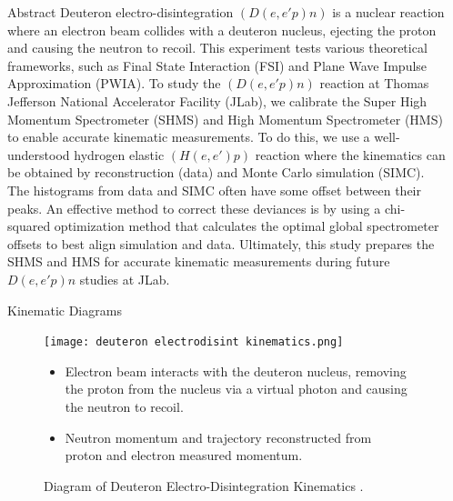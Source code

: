\documentclass[final]{beamer}
\newlength{\sepwidth}
\newlength{\colwidth}
\newcommand{\separatorcolumn}{\begin{column}{\sepwidth}\end{column}}
\begin{document}
\begin{frame}[t]
\begin{columns}[t]
\separatorcolumn

\begin{column}{\colwidth}
\vspace{-.5cm}
  \begin{exampleblock}{Abstract}
    Deuteron electro-disintegration $(D(e,e'p)n)$ is a nuclear reaction where an electron beam collides with a deuteron nucleus, ejecting the proton and causing the neutron to recoil. This experiment tests various theoretical frameworks, such as Final State Interaction (FSI) and Plane Wave Impulse Approximation (PWIA). To study the $(D(e, e'p)n)$ reaction at Thomas Jefferson National Accelerator Facility (JLab), we calibrate the Super High Momentum Spectrometer (SHMS) and High Momentum Spectrometer (HMS) to enable accurate kinematic measurements. To do this, we use a well-understood hydrogen elastic $(H(e, e')p)$ reaction where the kinematics can be obtained by reconstruction (data) and Monte Carlo simulation (SIMC). The histograms from data and SIMC often have some offset between their peaks. An effective method to correct these deviances is by using a chi-squared optimization method that calculates the optimal global spectrometer offsets to best align simulation and data. Ultimately, this study prepares the SHMS and HMS for accurate kinematic measurements during future $D(e,e'p)n$ studies at JLab.
    \end{exampleblock}
\vspace{-0.5cm}
  \begin{block}{Kinematic Diagrams}
  \vspace{0cm}
  \begin{figure}
      \centering
      \texttt{[image: deuteron electrodisint kinematics.png]}
      \vspace{-1cm}
      \caption{Diagram of Deuteron Electro-Disintegration Kinematics \cite{yero2020thesis}.}
      \label{fig:deuteron-kinematics}
\vspace{-1cm}
\begin{itemize}
   \item Electron beam interacts with the deuteron nucleus, removing the proton from the nucleus via a virtual photon and causing the neutron to recoil.
   \item Neutron momentum and trajectory reconstructed from proton and electron measured momentum.
\end{itemize}
      \vspace{-1cm}

\end{figure}
\end{block}
\end{column}
\end{columns}
\end{frame}
\end{document}
